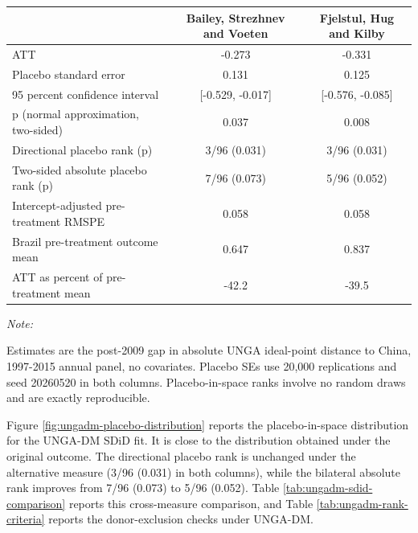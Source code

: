 \documentclass[referee,pdflatex,sn-basic]{sn-jnl}
\renewenvironment{table}[1][]{\tableorg[#1]}{\endtableorg\normalfont}
\theoremstyle{thmstylethree}
\begin{document}
\begin{table}[H]
\centering
\caption{\label{tab:ungadm-sdid-comparison}Brazil SDiD under two sources of UNGA ideal points. Both columns use the same panel, the same donor pool, and the same placebo standard error settings; the outcome series is the only input that differs, and the synthetic-control weights are re-estimated from it.}
\centering
\fontsize{9}{11}\selectfont
\begin{threeparttable}
\begin{tabular}[t]{lcc}
\toprule
  & Bailey, Strezhnev and Voeten & Fjelstul, Hug and Kilby\\
\midrule
ATT & -0.273 & -0.331\\
Placebo standard error & 0.131 & 0.125\\
95 percent confidence interval & {}[-0.529, -0.017] & {}[-0.576, -0.085]\\
p (normal approximation, two-sided) & 0.037 & 0.008\\
Directional placebo rank (p) & 3/96 (0.031) & 3/96 (0.031)\\
\addlinespace
Two-sided absolute placebo rank (p) & 7/96 (0.073) & 5/96 (0.052)\\
Intercept-adjusted pre-treatment RMSPE & 0.058 & 0.058\\
Brazil pre-treatment outcome mean & 0.647 & 0.837\\
ATT as percent of pre-treatment mean & -42.2 & -39.5\\
\bottomrule
\end{tabular}
\begin{tablenotes}
\item \textit{Note: } 
\item Estimates are the post-2009 gap in absolute UNGA ideal-point distance to China, 1997-2015 annual panel, no covariates. Placebo SEs use 20,000 replications and seed 20260520 in both columns. Placebo-in-space ranks involve no random draws and are exactly reproducible.
\end{tablenotes}
\end{threeparttable}
\end{table}

Figure \ref{fig:ungadm-placebo-distribution} reports the placebo-in-space distribution for the UNGA-DM SDiD fit. It is close to the distribution obtained under the original outcome. The directional placebo rank is unchanged under the alternative measure (3/96 (0.031) in both columns), while the bilateral absolute rank improves from 7/96 (0.073) to 5/96 (0.052). Table \ref{tab:ungadm-sdid-comparison} reports this cross-measure comparison, and Table \ref{tab:ungadm-rank-criteria} reports the donor-exclusion checks under UNGA-DM.
\end{document}

